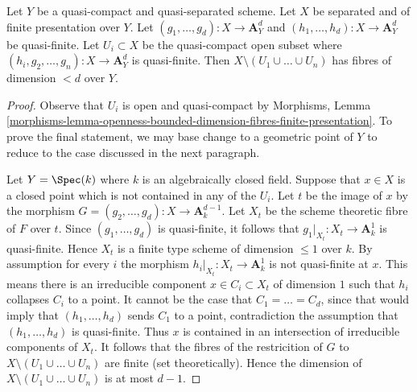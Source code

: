\begin{lemma}
\label{lemma-switch-coordinates}
Let $Y$ be a quasi-compact and quasi-separated scheme.
Let $X$ be separated and of finite presentation over $Y$.
Let $(g_1, \ldots, g_d) : X \to \mathbf{A}^d_Y$ and
$(h_1, \ldots, h_d) : X \to \mathbf{A}^d_Y$
be quasi-finite. Let $U_i \subset X$ be the quasi-compact
open subset where $(h_i, g_2, \ldots, g_n) : X \to \mathbf{A}^d_Y$
is quasi-finite. Then $X \setminus (U_1 \cup \ldots \cup U_n)$
has fibres of dimension $< d$ over $Y$.
\end{lemma}

\begin{proof}
Observe that $U_i$ is open and quasi-compact by Morphisms, Lemma
\ref{morphisms-lemma-openness-bounded-dimension-fibres-finite-presentation}.
To prove the final statement, we may base change to a geometric
point of $Y$ to reduce to the case discussed in the next paragraph.

\medskip\noindent
Let $Y = \Spec(k)$ where $k$ is an algebraically closed field.
Suppose that $x \in X$ is a closed point which
is not contained in any of the $U_i$.
Let $t$ be the image of $x$ by the morphism
$G = (g_2, \ldots, g_d) : X \to \mathbf{A}^{d - 1}_k$.
Let $X_t$ be the scheme theoretic fibre of $F$ over $t$.
Since $(g_1, \ldots, g_d)$ is quasi-finite, it follows
that $g_1|_{X_t} : X_t \to \mathbf{A}^1_k$ is quasi-finite.
Hence $X_t$ is a finite type scheme of dimension $\leq 1$ over $k$.
By assumption for every $i$ the morphism
$h_i|_{X_t} : X_t \to \mathbf{A}^1_k$ is not quasi-finite at $x$.
This means there is an irreducible component $x \in C_i \subset X_t$
of dimension $1$ such that $h_i$ collapses $C_i$ to a point.
It cannot be the case that $C_1 = \ldots = C_d$, since that
would imply that $(h_1, \ldots, h_d)$ sends $C_1$ to a point,
contradiction the assumption that $(h_1, \ldots, h_d)$ is quasi-finite.
Thus $x$ is contained in an intersection of irreducible components
of $X_t$. It follows that the fibres of the restricition of $G$ to
$X \setminus (U_1 \cup \ldots \cup U_n)$ are finite (set theoretically).
Hence the dimension of $X \setminus (U_1 \cup \ldots \cup U_n)$
is at most $d - 1$.
\end{proof}

